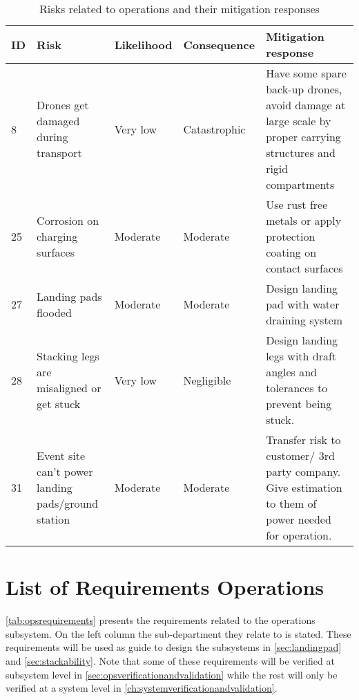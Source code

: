 \begin{small}
\begin{longtable}[c]{|p{}|p{4cm}|p{}|p{}|p{6cm}|}
\caption{Risks related to operations and their mitigation responses}
\label{tab:risksoperations}
\\
\hline
\textbf{ID} & \textbf{Risk} & \textbf{Likelihood} & \textbf{Consequence} & \textbf{Mitigation response} \\ \hline
\endfirsthead
%
\endhead
%
8 & Drones get damaged during transport & Very low & Catastrophic & Have some spare back-up drones, avoid damage at large scale by proper carrying structures and rigid compartments \\ \hline
25 & Corrosion on charging surfaces & Moderate & Moderate & Use rust free metals or apply protection coating on contact surfaces \\ \hline
27 & Landing pads flooded & Moderate & Moderate & Design landing pad with water draining system \\ \hline
28 & Stacking legs are misaligned or get stuck & Very low & Negligible & Design landing legs with draft angles and tolerances to prevent being stuck. \\ \hline
31 & Event site can't power landing pads/ground station & Moderate & Moderate & Transfer risk to customer/ 3rd party company. Give estimation to them of power needed for operation. \\ \hline
\end{longtable}
\end{small}




\section{List of Requirements Operations} \label{sec:opslistofrequirements}

\autoref{tab:opsrequirements} presents the requirements related to the operations subsystem. On the left column the sub-department they relate to is stated. These requirements will be used as guide to design the subsystems in \autoref{sec:landingpad} and \autoref{sec:stackability}. Note that some of these requirements will be verified at subsystem level in \autoref{sec:opsverificationandvalidation} while the rest will only be verified at a system level in \autoref{ch:systemverificationandvalidation}.

